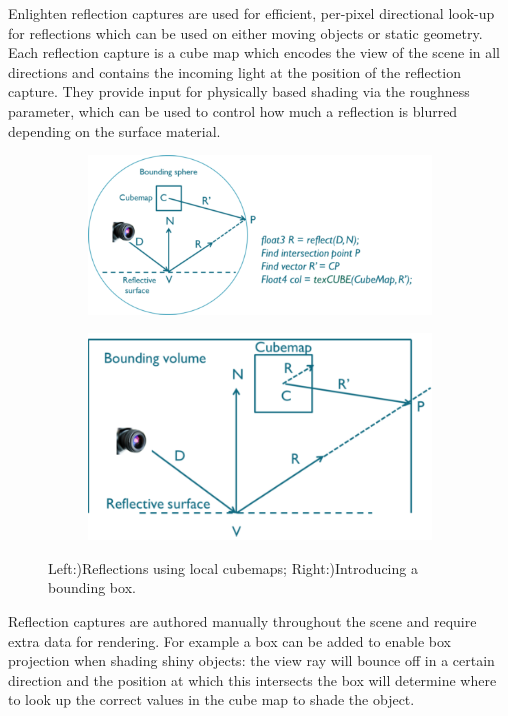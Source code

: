 Enlighten reflection captures are used for efficient, per-pixel directional look-up for reflections which can be used on either moving objects or static geometry.  Each reflection capture is a cube map which encodes the view of the scene in all directions and contains the incoming light at the position of the reflection capture. They provide input for physically based shading via the roughness parameter, which can be used to control how much a reflection is blurred depending on the surface material.

\begin{figure}\label{f:reflection-local}
	\begin{subfigure}[b]{0.59\textwidth}
		\includegraphics[width=1.0\textwidth]{graphics/gi/path-33-1}
	\end{subfigure}
	\begin{subfigure}[b]{0.39\textwidth}
		\includegraphics[width=1.0\textwidth]{graphics/gi/path-33-2}
	\end{subfigure}
	\caption{Left:)Reflections using local cubemaps; Right:)Introducing a bounding box.}
\end{figure}

Reflection captures are authored manually throughout the scene and require extra data for rendering. For example a box can be added to enable box projection when shading shiny objects: the view ray will bounce off in a certain direction and the position at which this intersects the box will determine where to look up the correct values in the cube map to shade the object.

